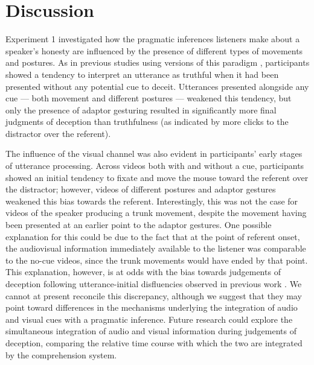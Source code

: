 \documentclass[a4paper,man,natbib]{apa6}
\begin{document}
\section{Discussion}
Experiment 1 investigated how the pragmatic inferences listeners make about a speaker's honesty are influenced by the presence of different types of movements and postures. 
As in previous studies using versions of this paradigm \citep{Loy2017, King2018}, participants showed a tendency to interpret an utterance as truthful when it had been presented without any potential cue to deceit.
Utterances presented alongside any cue --- both movement and different postures --- weakened this tendency, but only the presence of adaptor gesturing resulted in significantly more final judgments of deception than truthfulness (as indicated by more clicks to the distractor over the referent).

The influence of the visual channel was also evident in participants' early stages of utterance processing. 
Across videos both with and without a cue, participants showed an initial tendency to fixate and move the mouse toward the referent over the distractor; however, videos of different postures and adaptor gestures weakened this bias towards the referent.
Interestingly, this was not the case for videos of the speaker producing a trunk movement, despite the movement having been presented at an earlier point to the adaptor gestures.
One possible explanation for this could be due to the fact that at the point of referent onset, the audiovisual information immediately available to the listener was comparable to the no-cue videos, since the trunk movements would have ended by that point.
This explanation, however, is at odds with the bias towards judgements of deception following utterance-initial disfluencies observed in previous work \citetext{\citet{Loy2017}, Experiment 1}.
We cannot at present reconcile this discrepancy, although we suggest that they may point toward differences in the mechanisms underlying the integration of audio and visual cues with a pragmatic inference.
Future research could explore the simultaneous integration of audio and visual information during judgements of deception, comparing the relative time course with which the two are integrated by the comprehension system. %
\end{document}
